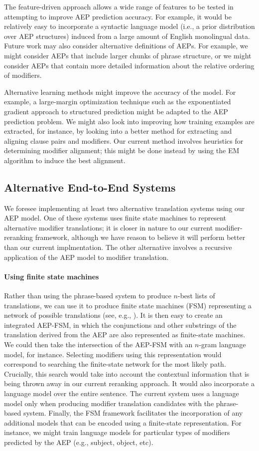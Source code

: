 \documentclass[11pt]{report}
\theoremstyle{plain}
\begin{document}
{The feature-driven approach allows a wide range of features to be
tested in attempting to improve AEP prediction accuracy. For example,
it would be relatively easy to incorporate a syntactic language model
(i.e., a prior distribution over AEP structures) induced from a large
amount of English monolingual data. Future work may also consider
alternative definitions of AEPs. For example, we might consider AEPs
that include larger chunks of phrase structure, or we might consider
AEPs that contain more detailed information about the relative
ordering of modifiers.

Alternative learning methods might improve the accuracy of the
model. For example, a large-margin optimization technique such as the
exponentiated gradient approach to structured prediction 
might be adapted to the AEP prediction problem. We might also look
into improving how training examples are extracted, for instance, by
looking into a better method for extracting and aligning clause pairs
and modifiers. Our current method involves heuristics for determining
modifier alignment; this might be done instead by using the EM
algorithm to induce the best alignment.

\subsection{Alternative End-to-End Systems}
We foresee implementing at least two alternative translation systems
using our AEP model. One of these systems uses finite state machines
to represent alternative modifier translations; it is closer in nature
to our current modifier-reranking framework, although we have reason
to believe it will perform better than our current implmentation. The
other alternative involves a recursive application of the AEP model to
modifier translation.

\paragraph{Using finite state machines}
Rather than using the phrase-based system to produce $n$-best lists of
translations, we can use it to produce finite state machines (FSM)
representing a network of possible translations (see, e.g.,
). It is then easy to create an integrated AEP-FSM, in
which the conjunctions and other substrings of the translation derived
from the AEP are also represented as finite-state machines. We could
then take the intersection of the AEP-FSM with an $n$-gram language
model, for instance. Selecting modifiers using this representation
would correspond to searching the finite-state network for the most
likely path. Crucially, this search would take into account the
contextual information that is being thrown away in our current
reranking approach. It would also incorporate a language model over
the entire sentence. The current system uses a language model only
when producing modifier translation candidates with the phrase-based
system. Finally, the FSM framework facilitates the incorporation of
any additional models that can be encoded using a finite-state
representation. For instance, we might train language models for
particular types of modifiers predicted by the AEP (e.g., subject,
object, etc).

}
\end{document}
